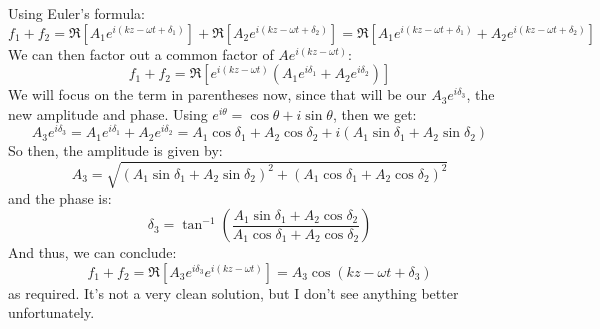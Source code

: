 \documentclass[10pt]{article}
\begin{document}
\begin{enumerate}[label=(\alph*)]
		\begin{solution}
			Using Euler's formula:
			\[
				f_1 + f_2 = \Re\left[ A_1 e^{i(kz - \omega t + \delta_1)} \right]  + \Re\left[ A_2e^{i(kz -
				\omega t + \delta_2)} \right] = \Re\left[ A_1 e^{i (kz - \omega t + \delta_1)} + A_2e^{i (kz
				- \omega t + \delta_2)} \right]
			\]
			We can then factor out a common factor of \( Ae^{i(kz - \omega t)} \):
			\[
				f_1 + f_2 = \Re\left[ e^{i(kz - \omega t)}\left( A_1 e^{i \delta_1} + A_2e^{i\delta_2}
				\right) \right]
			\]
			We will focus on the term in parentheses now, since that will be our \( A_3e^{i \delta_3} \), the
			new amplitude and phase. Using \( e^{i \theta} = \cos \theta + i \sin \theta
			\), then we get:
			\[
				A_3 e^{i \delta_3} = A_1 e^{i \delta_1} + A_2 e^{i \delta_2} 
				= A_1 \cos \delta_1 + A_2 \cos \delta_2 + i(A_1 \sin
				\delta_1 + A_2 \sin \delta_2)
			\]
			So then, the amplitude is given by:
			\[
				A_3 = \sqrt{(A_1 \sin \delta_1 + A_2 \sin \delta_2)^2 + (A_1 \cos \delta_1 + A_2 \cos
				\delta_2)^2}
			\]
			and the phase is:
			\[
				\delta_3 = \tan^{-1}\left( \frac{A_1 \sin \delta_1 + A_2 \cos \delta_2}{A_1 \cos \delta_1 
				+ A_2 \cos \delta_2} \right) 
			\]
			And thus, we can conclude:
			\[
				f_1 + f_2 = \Re\left[ A_3e^{i \delta_3} e^{i(kz - \omega t)} \right] = A_3 \cos(kz - \omega t
				+ \delta_3)
			\]
			as required. It's not a very clean solution, but I don't see anything better unfortunately. 
		\end{solution}
	\end{enumerate}

	\pagebreak
\end{document}
